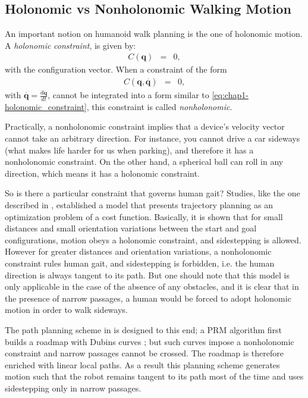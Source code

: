 \subsection{Holonomic vs Nonholonomic Walking Motion}
\label{subsec:chap1-holonomic}

An important notion on humanoid walk planning is the one of holonomic
motion.
A \emph{holonomic} \emph{constraint}, is given by:
\begin{eqnarray} C(\mathbf{q}) & = & 0,
  \label{eq:chap1-holonomic_constraint}
\end{eqnarray}
with \config{} the configuration vector. When a constraint of the form
\begin{eqnarray}
  C(\mathbf{q,}\overset{.}{\mathbf{q}}) & = & 0,
\end{eqnarray}
with $\mathbf{\overset{.}{\mathbf{q}}=}\frac{d\mathbf{q}}{dt}$, cannot
be integrated into a form similar to \ref{eq:chap1-holonomic_constraint},
this constraint is called \emph{nonholonomic}.

Practically, a nonholonomic constraint implies that a device's
velocity vector cannot take an arbitrary direction. For instance, you
cannot drive a car sideways (what makes life harder for us when
parking), and therefore it has a nonholonomic constraint. On the other
hand, a spherical ball can roll in any direction, which means it has a
holonomic constraint.

So is there a particular constraint that governs human gait? Studies,
like the one described in \cite{momb10}, established a model that
presents trajectory planning as an optimization problem of a cost
function. Basically, it is shown that for small distances and small
orientation variations between the start and goal configurations,
motion obeys a holonomic constraint, and sidestepping is allowed.
However for greater distances and orientation variations, a
nonholonomic constraint rules human gait, and sidestepping is
forbidden, i.e. the human direction is always tangent to its path.
But one should note that this model is only applicable in the case of
the absence of any obstacles, and it is clear that in the presence of
narrow passages, a human would be forced to adopt holonomic motion in
order to walk sideways.

The path planning scheme in \cite{yosh08} is designed to this end; a
PRM algorithm first builds a roadmap with Dubins curves \cite{dubi57};
but such curves impose a nonholonomic constraint and narrow passages
cannot be crossed. The roadmap is therefore enriched with linear local
paths. As a result this planning scheme generates motion such that the
robot remains tangent to its path most of the time and uses
sidestepping only in narrow passages.


